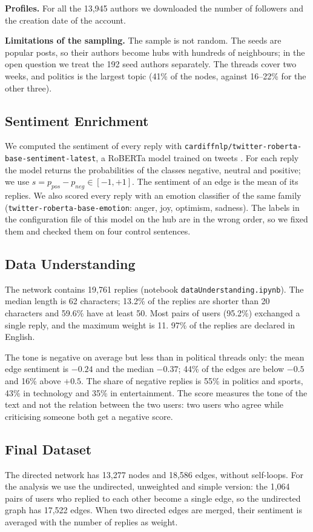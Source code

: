 \documentclass[sigchi]{acmart}
\begin{document}
\textbf{Profiles.} For all the 13,945 authors we downloaded the number of followers and the creation date of the account.

\textbf{Limitations of the sampling.} The sample is not random. The seeds are popular posts, so their authors become hubs with hundreds of neighbours; in the open question we treat the 192 seed authors separately. The threads cover two weeks, and politics is the largest topic (41\% of the nodes, against 16--22\% for the other three).

\subsection{Sentiment Enrichment}\label{sec:sentiment}
We computed the sentiment of every reply with \texttt{cardiffnlp/}\allowbreak\texttt{twitter-roberta-base-sentiment-latest}, a RoBERTa model trained on tweets \cite{loureiro2022timelms}. For each reply the model returns the probabilities of the classes negative, neutral and positive; we use $s = p_{pos} - p_{neg} \in [-1,+1]$. The sentiment of an edge is the mean of its replies. We also scored every reply with an emotion classifier of the same family (\texttt{twitter-roberta-base-emotion}: anger, joy, optimism, sadness). The labels in the configuration file of this model on the hub are in the wrong order, so we fixed them and checked them on four control sentences.

\subsection{Data Understanding}
The network contains 19,761 replies (notebook \texttt{dataUnderstanding.ipynb}). The median length is 62 characters; 13.2\% of the replies are shorter than 20 characters and 59.6\% have at least 50. Most pairs of users (95.2\%) exchanged a single reply, and the maximum weight is 11. 97\% of the replies are declared in English.

The tone is negative on average but less than in political threads only: the mean edge sentiment is $-0.24$ and the median $-0.37$; 44\% of the edges are below $-0.5$ and 16\% above $+0.5$. The share of negative replies is 55\% in politics and sports, 43\% in technology and 35\% in entertainment. The score measures the tone of the text and not the relation between the two users: two users who agree while criticising someone both get a negative score.

\subsection{Final Dataset}
The directed network has 13,277 nodes and 18,586 edges, without self-loops. For the analysis we use the undirected, unweighted and simple version: the 1,064 pairs of users who replied to each other become a single edge, so the undirected graph has 17,522 edges. When two directed edges are merged, their sentiment is averaged with the number of replies as weight.
\end{document}
